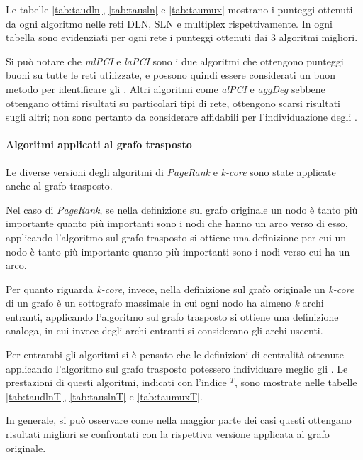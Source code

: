Le tabelle \ref{tab:taudln}, \ref{tab:tausln} e \ref{tab:taumux} mostrano i punteggi 
ottenuti da ogni algoritmo nelle reti DLN, SLN e multiplex rispettivamente.
In ogni tabella sono evidenziati per ogni rete i punteggi ottenuti dai \num{3} algoritmi 
migliori. 

Si può notare che \textit{mlPCI} e \textit{laPCI} sono i due algoritmi che ottengono punteggi buoni 
su tutte le reti utilizzate, e possono quindi essere considerati un buon metodo per identificare 
gli \infsp. 
Altri algoritmi come \textit{alPCI} e \textit{aggDeg} sebbene ottengano ottimi risultati su
particolari tipi di rete, ottengono scarsi risultati sugli altri; non sono pertanto da 
considerare affidabili per l'individuazione degli \infsp.





\paragraph{Algoritmi applicati al grafo trasposto}
Le diverse versioni degli algoritmi di \textit{PageRank} e \textit{k-core} sono state applicate anche al grafo trasposto.

Nel caso di \textit{PageRank}, se nella definizione sul grafo originale un nodo è tanto più importante quanto 
più importanti sono i nodi che hanno un arco verso di esso, applicando l'algoritmo sul grafo trasposto si ottiene
una definizione per cui un nodo è tanto più importante quanto più importanti sono i nodi verso cui ha un arco.

Per quanto riguarda \textit{k-core}, invece, nella definizione sul grafo originale un \textit{k-core} di un grafo è un sottografo 
massimale in cui ogni nodo ha almeno \textit{k} archi entranti, applicando l'algoritmo sul grafo trasposto si ottiene 
una definizione analoga, in cui invece degli archi entranti si considerano gli archi uscenti.

Per entrambi gli algoritmi si è pensato che le definizioni di centralità ottenute applicando l'algoritmo 
sul grafo trasposto potessero individuare meglio gli \infsp. Le prestazioni di questi algoritmi, indicati 
con l'indice $^T$, sono mostrate nelle tabelle \ref{tab:taudlnT}, \ref{tab:tauslnT} e \ref{tab:taumuxT}.

In generale, si può osservare come nella maggior parte dei casi questi ottengano risultati migliori se confrontati con 
la rispettiva versione applicata al grafo originale. 

